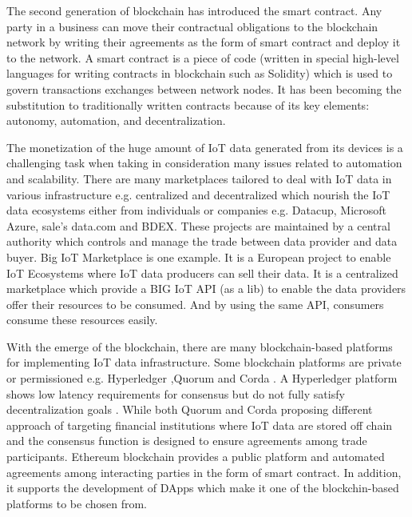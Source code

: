 \documentclass[letterpaper, 10 pt, conference]{ieeeconf}  %
\begin{document}
The second generation of blockchain has introduced the smart contract. Any party in a business can move their contractual obligations to the blockchain network by writing their agreements as the form of smart contract and deploy it to the network. A smart contract is a piece of code (written in special high-level languages for writing contracts in blockchain such as Solidity) which is used to govern transactions exchanges between network nodes. It has been becoming the substitution to traditionally written contracts because of its key elements: autonomy, automation, and decentralization\cite{8}.  

The monetization of the huge amount of IoT data generated from its devices is a challenging task when taking in consideration many issues related to automation and scalability. There are many marketplaces tailored to deal with IoT data in various infrastructure e.g. centralized and decentralized which nourish the IoT data ecosystems either from individuals or companies e.g. Datacup, Microsoft Azure, sale’s data.com and BDEX. These projects are maintained by a central authority which controls and manage the trade between data provider and data buyer. Big IoT Marketplace \cite{14} is one example. It is a European project to enable IoT Ecosystems where IoT data producers can sell their data. It is a centralized marketplace which provide a BIG IoT API (as a lib) to enable the data providers offer their resources to be consumed. And by using the same API, consumers consume these resources easily. 
 
 With the emerge of the blockchain, there are many blockchain-based platforms for implementing IoT data infrastructure. Some blockchain platforms are private or permissioned e.g. Hyperledger \cite{15},Quorum \cite{16} and Corda \cite{17}. A Hyperledger platform shows low latency requirements for consensus but do not fully satisfy decentralization goals \cite{18}. While both Quorum and Corda proposing different approach of targeting financial institutions where IoT data are stored off chain and the consensus function is designed to ensure agreements among trade participants. Ethereum blockchain provides a public platform and automated agreements among interacting parties in the form of smart contract. In addition, it supports the development of DApps which make it one of the blockchin-based platforms to be chosen from. 
\end{document}
